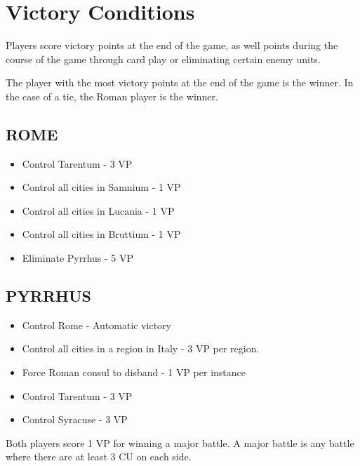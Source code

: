 \section{Victory Conditions}
Players score victory points at the end of the game, as well points during the course of the game through card play or eliminating certain enemy units.

The player with the most victory points at the end of the game is the winner. In the case of a tie, the Roman player is the winner.

\subsection{ROME}

\begin{itemize}
  \setlength{\itemsep}{-6pt}
  \item Control Tarentum - 3 VP
  \item Control all cities in Samnium - 1 VP
  \item Control all cities in Lucania - 1 VP
  \item Control all cities in Bruttium - 1 VP
  \item Eliminate Pyrrhus - 5 VP

\end{itemize}

\subsection{PYRRHUS}
\begin{itemize}
  \setlength{\itemsep}{-6pt}
  \item Control Rome - Automatic victory
  \item Control all cities in a region in Italy - 3 VP per region.
  \item Force Roman consul to disband - 1 VP per instance
  \item Control Tarentum - 3 VP
  \item Control Syracuse - 3 VP
\end{itemize}

Both players score 1 VP for winning a major battle. A major battle is any battle where there are at least 3 CU on each side.